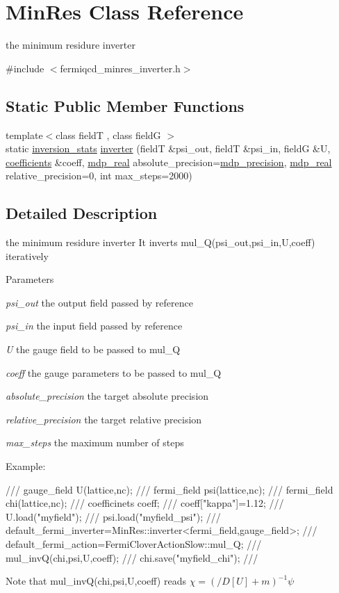 \hypertarget{class_min_res}{
\section{MinRes Class Reference}
\label{class_min_res}
}


the minimum residure inverter  


{\ttfamily \#include $<$fermiqcd\_\-minres\_\-inverter.h$>$}\subsection*{Static Public Member Functions}
\begin{DoxyCompactItemize}
\item 
{\footnotesize template$<$class fieldT , class fieldG $>$ }\\static \hyperlink{classinversion__stats}{inversion\_\-stats} \hyperlink{class_min_res_ac42d7344449126a5aa109222de0ef527}{inverter} (fieldT \&psi\_\-out, fieldT \&psi\_\-in, fieldG \&U, \hyperlink{classcoefficients}{coefficients} \&coeff, \hyperlink{mdp__global__vars_8h_a049e4c1d4e74d644878a42f9909463e4}{mdp\_\-real} absolute\_\-precision=\hyperlink{mdp__global__vars_8h_a443a4ca745298420893e113a7ac926a9}{mdp\_\-precision}, \hyperlink{mdp__global__vars_8h_a049e4c1d4e74d644878a42f9909463e4}{mdp\_\-real} relative\_\-precision=0, int max\_\-steps=2000)
\end{DoxyCompactItemize}


\subsection{Detailed Description}
the minimum residure inverter It inverts mul\_\-Q(psi\_\-out,psi\_\-in,U,coeff) iteratively 
\begin{DoxyParams}{Parameters}
\item[{\em psi\_\-out}]the output field passed by reference \item[{\em psi\_\-in}]the input field passed by reference \item[{\em U}]the gauge field to be passed to mul\_\-Q \item[{\em coeff}]the gauge parameters to be passed to mul\_\-Q \item[{\em absolute\_\-precision}]the target absolute precision \item[{\em relative\_\-precision}]the target relative precision \item[{\em max\_\-steps}]the maximum number of steps\end{DoxyParams}
Example: \begin{DoxyVerb}
/// gauge_field U(lattice,nc);
/// fermi_field psi(lattice,nc);
/// fermi_field chi(lattice,nc);
/// coefficinets coeff;
/// coeff["kappa"]=1.12;
/// U.load("myfield");
/// psi.load("myfield_psi");
/// default_fermi_inverter=MinRes::inverter<fermi_field,gauge_field>;
/// default_fermi_action=FermiCloverActionSlow::mul_Q;
/// mul_invQ(chi,psi,U,coeff);
/// chi.save("myfield_chi");
/// \end{DoxyVerb}
 Note that mul\_\-invQ(chi,psi,U,coeff) reads $ \chi=(/\!\!\!D[U]+m)^{-1}\psi $ 

